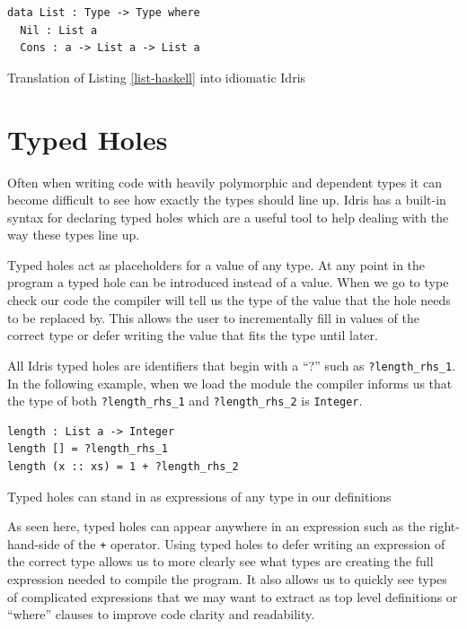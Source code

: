 \documentclass[a4paper, notitlepage]{report}
\begin{document}
\begin{listing}[H]
\begin{verbatim}
data List : Type -> Type where
  Nil : List a
  Cons : a -> List a -> List a
\end{verbatim}
\caption{Translation of Listing \ref{list-haskell} into idiomatic Idris}
\end{listing}

\section{Typed Holes}
\label{sec:org743d2b9}
Often when writing code with heavily polymorphic and dependent types it can
become difficult to see how exactly the types should line up. Idris has a
built-in syntax for declaring typed holes which are a useful tool to help
dealing with the way these types line up.

Typed holes act as placeholders for a value of any type. At any point in the
program a typed hole can be introduced instead of a value. When we go to type
check our code the compiler will tell us the type of the value that the hole
needs to be replaced by. This allows the user to incrementally fill in values of
the correct type or defer writing the value that fits the type until later.

All Idris typed holes are identifiers that begin with a ``?'' such as
\texttt{?length\_rhs\_1}. In the following example, when we load the module the compiler
informs us that the type of both \texttt{?length\_rhs\_1} and \texttt{?length\_rhs\_2} is \texttt{Integer}.

\begin{listing}[H]
\begin{verbatim}
length : List a -> Integer
length [] = ?length_rhs_1
length (x :: xs) = 1 + ?length_rhs_2
\end{verbatim}
\caption{Typed holes can stand in as expressions of any type in our definitions}
\end{listing}

As seen here, typed holes can appear anywhere in an expression such as the
right-hand-side of the \texttt{+} operator. Using typed holes to defer writing an
expression of the correct type allows us to more clearly see what types are
creating the full expression needed to compile the program. It also allows us to
quickly see types of complicated expressions that we may want to extract as top
level definitions or ``where'' clauses to improve code clarity and readability.
\end{document}
